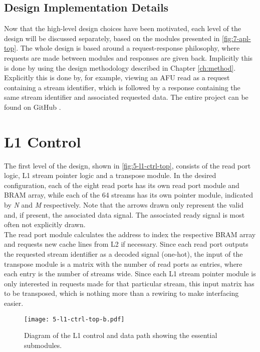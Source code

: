 \subsection{Design Implementation Details}
Now that the high-level design choices have been motivated, each level of the design will be discussed separately, based on the modules presented in \autoref{fig:7-apl-top}. The whole design is based around a request-response philosophy, where requests are made between modules and responses are given back. Implicitly this is done by using the design methodology described in Chapter \ref{ch:method}. Explicitly this is done by, for example, viewing an AFU read as a request containing a stream identifier, which is followed by a response containing the same stream identifier and associated requested data. The entire project can be found on GitHub \cite{yvo-lib}.





\section{L1 Control}
The first level of the design, shown in \autoref{fig:5-l1-ctrl-top}, consists of the read port logic, L1 stream pointer logic and a transpose module. In the desired configuration, each of the eight read ports has its own read port module and BRAM array, while each of the 64 streams has its own pointer module, indicated by \textit{N} and \textit{M} respectively. Note that the arrows drawn only represent the valid and, if present, the associated data signal. The associated ready signal is most often not explicitly drawn.\\
The read port module calculates the address to index the respective BRAM array and requests new cache lines from L2 if necessary. Since each read port outputs the requested stream identifier as a decoded signal (one-hot), the input of the transpose module is a matrix with the number of read ports as entries, where each entry is the number of streams wide. Since each L1 stream pointer module is only interested in requests made for that particular stream, this input matrix has to be transposed, which is nothing more than a rewiring to make interfacing easier.

\begin{figure}[H]
  \centering
  \texttt{[image: 5-l1-ctrl-top-b.pdf]}
  \caption{Diagram of the L1 control and data path showing the essential submodules.}
  \label{fig:5-l1-ctrl-top}
\end{figure}



